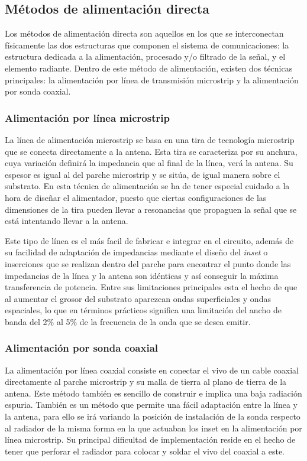 \subsection{Métodos de alimentación directa}
\par Los métodos de alimentación directa son aquellos en los que se interconectan físicamente las dos estructuras que componen el sistema de comunicaciones: la estructura dedicada a la alimentación, procesado y/o filtrado de la señal, y el elemento radiante. Dentro de este método de alimentación, existen dos técnicas principales: la alimentación por línea de transmisión microstrip y la alimentación por sonda coaxial.

\subsubsection{Alimentación por línea microstrip}
\par La línea de alimentación microstrip se basa en una tira de tecnología microstrip que se conecta directamente a la antena. Esta tira se caracteriza por su anchura, cuya variación definirá la impedancia que al final de la línea, verá la antena. Su espesor es igual al del parche microstrip y se sitúa, de igual manera sobre el substrato. En esta técnica de alimentación se ha de tener especial cuidado a la hora de diseñar el alimentador, puesto que ciertas configuraciones de las dimensiones de la tira pueden llevar a resonancias que propaguen la señal que se está intentando llevar a la antena. 
\\
\par Este tipo de línea es el más facil de fabricar e integrar en el circuito, además de su facilidad de adaptación de impedancias mediante el diseño del \textit{inset} o inserciones que se realizan dentro del parche para encontrar el punto donde las impedancias de la línea y la antena son idénticas y así conseguir la máxima transferencia de potencia. Entre sus limitaciones principales esta el hecho de que al aumentar el grosor del substrato aparezcan ondas superficiales y ondas espaciales, lo que en términos prácticos significa una limitación del ancho de banda del 2\% al 5\% de la frecuencia de la onda que se desea emitir.

\subsubsection{Alimentación por sonda coaxial}
\par La alimentación por línea coaxial consiste en conectar el vivo de un cable coaxial directamente al parche microstrip y su malla de tierra al plano de tierra de la antena. Este método también es sencillo de construir e implica una baja radiación espuria. También es un método que permite una fácil adaptación entre la línea y la antena, para ello se irá variando la posición de instalación de la sonda respecto al radiador de la misma forma en la que actuaban los inset en la alimentación por línea microstrip. Su principal dificultad de implementación reside en el hecho de tener que perforar el radiador para colocar y soldar el vivo del coaxial a este.

